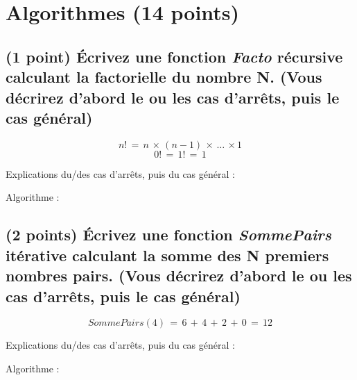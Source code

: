 \documentclass[11pt,a4paper]{article}
\begin{document}


\clearpage

\section{Algorithmes (14 points)}

\subsection{(1 point) \'Ecrivez une fonction \og \textit{Facto} \fg{} récursive calculant la factorielle du nombre N. (Vous décrirez d'abord le ou les cas d'arrêts, puis le cas général) }


\vspace*{-0.5cm}

\begin{center}

\begin{equation*}
n! \, = \, n \, \times \, (n - 1) \, \times \, \ldots \, \times 1
\end{equation*}
%
\vspace*{-0.5cm}
%
\begin{equation*}
0! \, = \, 1! \, = \, 1
\end{equation*}

Explications du/des cas d'arrêts, puis du cas général :

\bigskip

Algorithme :
\end{center}


\clearpage


\subsection{(2 points) \'Ecrivez une fonction \og \textit{SommePairs} \fg{} itérative calculant la somme des N premiers nombres pairs. (Vous décrirez d'abord le ou les cas d'arrêts, puis le cas général) }

\vspace*{-0.5cm}

\begin{center}

\begin{equation*}
SommePairs(4)  \, = \,  6 \, + \, 4 \, + \, 2 \, + \, 0  \, = \,  12
\end{equation*}

Explications du/des cas d'arrêts, puis du cas général :

\bigskip

Algorithme :
\end{center}
\end{document}
